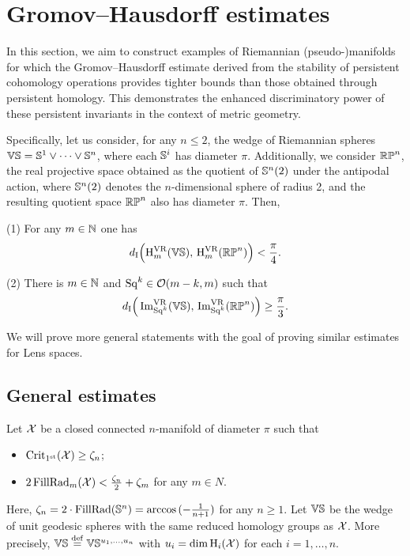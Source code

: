
\section{Gromov--Hausdorff estimates}\label{prop:db estimate}

In this section, we aim to construct examples of Riemannian (pseudo-)manifolds for which the Gromov--Hausdorff estimate derived from the stability of persistent cohomology operations provides tighter bounds than those obtained through persistent homology.
This demonstrates the enhanced discriminatory power of these persistent invariants in the context of metric geometry.

Specifically, let us consider, for any \(n \leq 2\), the wedge of Riemannian spheres \(\mathbb{V}\mathbb{S} = \mathbb{S}^1 \vee \dots \vee \mathbb{S}^n\), where each \(\mathbb{S}^i\) has diameter \(\pi\).
Additionally, we consider \(\mathbb{RP}^n\), the real projective space obtained as the quotient of \(\mathbb{S}^n(2)\) under the antipodal action, where \(\mathbb{S}^n(2)\) denotes the \(n\)-dimensional sphere of radius 2, and the resulting quotient space \(\mathbb{RP}^n\) also has diameter \(\pi\).
Then,

\medskip (1) For any \(m \in \mathbb{N}\) one has
\[
d_{\mathrm{I}}\Big(\mathrm{H}^{\mathrm{VR}}_m(\mathbb{V}\mathbb{S}),\, \mathrm{H}^{\mathrm{VR}}_m(\mathbb{RP}^n)\Big) < \frac{\pi}{4}.
\]

(2) There is \(m \in \mathbb{N}\) and \(\mathrm{Sq}^k \in \mathcal{O}(m-k, m)\) such that
\[
d_{\mathrm{I}}\Big(\operatorname{Im}_{\mathrm{Sq}^k}^{\mathrm{VR}}(\mathbb{V}\mathbb{S}),\, \operatorname{Im}_{\mathrm{Sq}^k}^{\mathrm{VR}}(\mathbb{RP}^n)\Big) \geq \frac{\pi}{3}.
\]

We will prove more general statements with the goal of proving similar estimates for Lens spaces.

\subsection{General estimates}

\label{ss:genberal_distance_comparison}

Let $\mathcal{X}$ be a closed connected \(n\)-manifold of diameter $\pi$ such that
\begin{itemize}
    \item $\operatorname{Crit_{1^{\mathrm{st}}}}(\mathcal{X}) \geq \zeta_n $;
    \item $2\operatorname{FillRad}_{m}(\mathcal{X}) < \tfrac{\zeta_n}{2}+\zeta_m$ for any $m \in N$.
\end{itemize}
Here, $\zeta_n = 2 \cdot \operatorname{FillRad}(\mathbb{S}^n)= \arccos{(-\tfrac{1}{n+1})}$ for any $n\geq 1$.
Let $\mathbb{V}\mathbb{S}$ be the wedge of unit geodesic spheres with the same reduced homology groups as $\mathcal{X}$.
More precisely, $\mathbb{V}\mathbb{S} \stackrel{\mathrm{def}}{=} \mathbb{V}\mathbb{S}^{u_1, \dots, u_n}$ with $u_i = \dim \operatorname{H}_i(\mathcal{X})$ for each $i = 1,\dots, n$.

